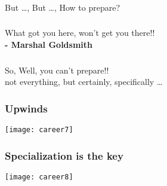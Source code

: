 \begin{frame}[fragile]\frametitle{}
	
	\begin{center}
	{\Large But \ldots, But \ldots, How to prepare?}  
	\end{center}

\end{frame}

\begin{frame}[fragile]\frametitle{}
	
	\begin{center}
	{\Large What got you here,  won’t get you there!!} \\
	{\bf - Marshal Goldsmith}
	\end{center}

\end{frame}

\begin{frame}[fragile]\frametitle{}
	
	\begin{center}
	{\Large So, Well, you can’t prepare!!}  \\
	
	not everything, but certainly, specifically \ldots
	\end{center}

\end{frame}

\begin{frame}[fragile]\frametitle{Upwinds}
	
	\begin{center}
	\texttt{[image: career7]}
	\end{center}

\end{frame}

\begin{frame}[fragile]\frametitle{Specialization is the key}
	
	\begin{center}
	\texttt{[image: career8]}
	\end{center}

\end{frame}

